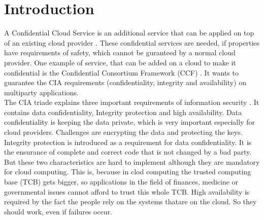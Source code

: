\section{Introduction}
	A Confidential Cloud Service is an additional service that can be applied on top of an existing cloud provider \cite{confidentiality}. These confidential services are needed, if properties have requirements of safety, which cannot be guranteed by a normal cloud provider. One example of service, that can be added on a cloud to make it confidential is the Confidential Consortium Framework (CCF) \cite{Howard}. It wants to guarantee the CIA requirements (confidentiality, integrity and availability) on multiparty applications.  \\
	 The CIA triade explains three important requirements of information security \cite{ciaBook} \cite{cia}. It contains data confidentiality, Integrity protection and high availability. Data confidentiality is keeping the data private, which is very important especially for cloud providers. Challenges are encrypting the data and protecting the keys. Integrity protection is introduced as a requirement for data confidentiality. It is the ensurance of complete and correct code that is not changed by a bad party. But these two characteristics are hard to implement although they are mandatory for cloud computing. This is, because in clod computing the trusted computing base (TCB) gets bigger, so applications in the field of finances, medicine or governmental issues cannot afford to trust this whole TCB. High availability is required by the fact the people rely on the systems thatare on the cloud. So they should work, even if failures occur.